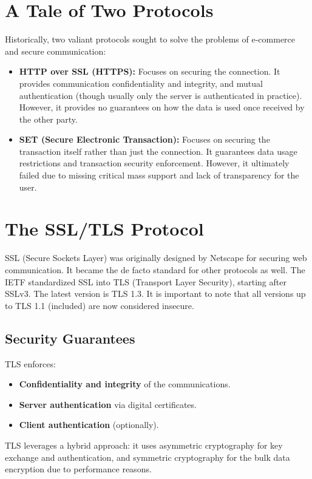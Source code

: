 \section{A Tale of Two Protocols}
Historically, two valiant protocols sought to solve the problems of e-commerce and secure communication:
\begin{itemize}
    \item \textbf{HTTP over SSL (HTTPS):} Focuses on securing the connection. It provides communication confidentiality and integrity, and mutual authentication (though usually only the server is authenticated in practice). However, it provides no guarantees on how the data is used once received by the other party.
    \item \textbf{SET (Secure Electronic Transaction):} Focuses on securing the transaction itself rather than just the connection. It guarantees data usage restrictions and transaction security enforcement. However, it ultimately failed due to missing critical mass support and lack of transparency for the user.
\end{itemize}

\section{The SSL/TLS Protocol}
SSL (Secure Sockets Layer) was originally designed by Netscape for securing web communication. It became the de facto standard for other protocols as well. The IETF standardized SSL into TLS (Transport Layer Security), starting after SSLv3. The latest version is TLS 1.3. It is important to note that all versions up to TLS 1.1 (included) are now considered insecure.

\subsection{Security Guarantees}
TLS enforces:
\begin{itemize}
    \item \textbf{Confidentiality and integrity} of the communications.
    \item \textbf{Server authentication} via digital certificates.
    \item \textbf{Client authentication} (optionally).
\end{itemize}
TLS leverages a hybrid approach: it uses asymmetric cryptography for key exchange and authentication, and symmetric cryptography for the bulk data encryption due to performance reasons.

